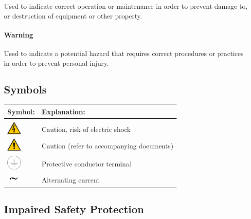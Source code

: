 Used to indicate correct operation or maintenance in order to prevent damage to, or destruction of equipment or other property.

\paragraph{Warning}

Used to indicate a potential hazard that requires correct procedures or practices in order to prevent personal injury.

\subsection{Symbols}
\begin{tabular}{l|l}
	\hline
	\textbf{Symbol:} & \textbf{Explanation:} \\
	\hline
	& \\
	\includegraphics[width=2em]{fig/hazard} & Caution, risk of electric shock\\
	\includegraphics[width=2em]{fig/caution} & Caution (refer to accompanying documents)\\
	\includegraphics[width=2em]{fig/ground_symbol} & Protective conductor terminal\\
	\includegraphics[width=2em]{fig/AC_symbol} & Alternating current\\
\end{tabular}

\subsection{Impaired Safety Protection}

